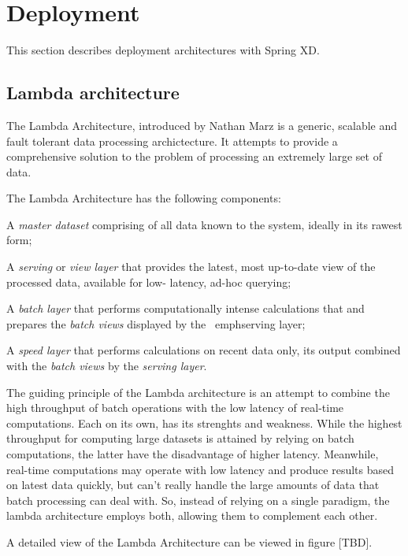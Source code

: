 \section{Deployment}
This section describes deployment architectures with Spring XD.
\subsection{Lambda architecture}

The Lambda Architecture, introduced by Nathan Marz \cite{lambda-architecture-paper} is a generic, scalable and fault tolerant data 
processing archictecture. It attempts to provide a comprehensive solution to the problem of processing an extremely large set of data.

The Lambda Architecture has the following components:

\begin{itemize*}
\item A \emph{master dataset} comprising of all data known to the system, ideally in its rawest form;
\item A \emph{serving} or \emph{view layer} that provides the latest, most up-to-date view of the processed data, available for low-
latency, ad-hoc querying;
\item A \emph{batch layer} that performs computationally intense calculations that and prepares the \emph{batch views} displayed by the \
emph{serving layer};
\item A \emph{speed layer} that performs calculations on recent data only, its output combined with the \emph{batch views} by the \emph{
serving layer}.
\end{itemize*}

The guiding principle of the Lambda architecture is an attempt to combine the high throughput of batch operations with the low latency of 
real-time computations. Each on its own, has its strenghts and weakness. While the highest throughput for computing large datasets is 
attained by relying on batch computations, the latter have the disadvantage of higher latency. Meanwhile, real-time computations may 
operate with low latency and produce results based on latest data quickly, but can't really handle the large amounts of data that batch 
processing can deal with. So, instead of relying on a single paradigm, the lambda architecture employs both, allowing them to complement 
each other.

A detailed view of the Lambda Architecture can be viewed in figure [TBD].

